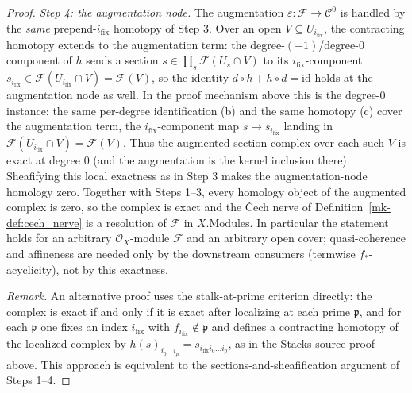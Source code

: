 \begin{proof}
  \emph{Step 4: the augmentation node.} The augmentation \(\varepsilon : \mathcal{F} \to
  \mathcal{C}^0\) is handled by the \emph{same} prepend-\(i_{\mathrm{fix}}\) homotopy of Step 3. Over an
  open \(V \subseteq U_{i_{\mathrm{fix}}}\), the contracting homotopy extends to the augmentation term:
  the degree-\((-1)\)/degree-\(0\) component of \(h\) sends a section \(s \in \prod_s \mathcal{F}(U_s
  \cap V)\) to its \(i_{\mathrm{fix}}\)-component \(s_{i_{\mathrm{fix}}} \in \mathcal{F}(U_{i_{\mathrm{fix}}}
  \cap V) = \mathcal{F}(V)\), so the identity \(d \circ h + h \circ d = \mathrm{id}\) holds at the
  augmentation node as well. In the proof mechanism above this is the degree-\(0\) instance: the
  same per-degree identification (b) and the same homotopy (c) cover the augmentation term, the
  \(i_{\mathrm{fix}}\)-component map \(s \mapsto s_{i_{\mathrm{fix}}}\) landing in
  \(\mathcal{F}(U_{i_{\mathrm{fix}}} \cap V) = \mathcal{F}(V)\). Thus the augmented section complex over each
  such \(V\) is exact at degree
  \(0\) (and the augmentation is the kernel inclusion there). Sheafifying this local exactness as in
  Step 3 makes the augmentation-node homology zero. Together with Steps 1--3, every homology object of
  the augmented complex is zero, so the complex is exact and the {\v C}ech nerve of
  Definition~\ref{mk-def:cech_nerve} is a resolution of \(\mathcal{F}\) in \(X.\mathrm{Modules}\). In
  particular the statement holds for an arbitrary \(\mathcal{O}_X\)-module \(\mathcal{F}\) and an
  arbitrary open cover; quasi-coherence and affineness are needed only by the downstream consumers
  (termwise \(f_*\)-acyclicity), not by this exactness.

  \emph{Remark.} An alternative proof uses the stalk-at-prime criterion directly: the complex is
  exact if and only if it is exact after localizing at each prime \(\mathfrak{p}\), and for each
  \(\mathfrak{p}\) one fixes an index \(i_{\text{fix}}\) with \(f_{i_{\text{fix}}} \notin \mathfrak{p}\)
  and defines a contracting homotopy of the localized complex by
  \(h(s)_{i_0 \ldots i_p} = s_{i_{\text{fix}} i_0 \ldots i_p}\), as in the Stacks source proof above.
  This approach is equivalent to the sections-and-sheafification argument of Steps 1--4.
\end{proof}

